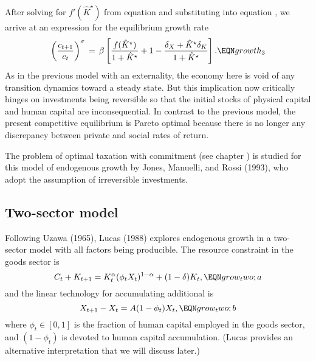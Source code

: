 After solving for $f'(\hat K^{\star})$ from equation  and
substituting into equation , we arrive at an expression for the
equilibrium growth rate
$$
\left({c_{t+1} \over c_t}\right)^\sigma \,=\,
      \beta \left[{f(\hat K^{\star}) \over 1+\hat K^{\star}}  +1
        - {\delta_X + \hat K^{\star} \delta_K \over 1+ \hat K^{\star}} \right].
                                                            \EQN growth_3
$$
As in the previous model with an externality, the economy here is
void of any transition dynamics toward a steady state.
But this implication  now critically hinges on investments being
reversible so that the initial stocks of physical capital and
human capital are inconsequential. In contrast to the previous model,
the present competitive equilibrium is Pareto optimal because there is
no longer any discrepancy between private and
social rates of return.

The problem of optimal taxation with commitment (see chapter ) is
studied for this model of endogenous growth by Jones, Manuelli, and
Rossi (1993),
 who adopt the assumption of irreversible investments.
  
\subsection{Two-sector model}

Following Uzawa (1965),
%
 Lucas (1988)
%
explores endogenous growth in a two-sector model with all factors
being producible. The resource constraint in the goods sector is
$$
C_t + K_{t+1} = K_t^\alpha (\phi_t X_t)^{1-\alpha} + (1-\delta) K_t,
                                                        \EQN grow_two;a
$$
and the linear technology for accumulating additional  is
$$
X_{t+1} - X_t = A (1-\phi_t) X_t,                       \EQN grow_two;b
$$
where $\phi_t\in[0,1]$ is the fraction of human capital employed in the
goods sector, and $(1-\phi_t)$ is devoted to human capital accumulation.
(Lucas provides an alternative interpretation that we will discuss
later.)

